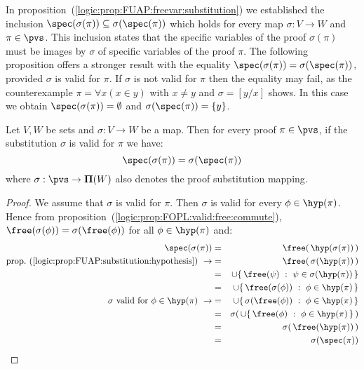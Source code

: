 In proposition~(\ref{logic:prop:FUAP:freevar:substitution}) we
established the inclusion
$\spec(\sigma(\pi))\subseteq\sigma(\spec(\pi))$ which holds for
every map $\sigma:V\to W$ and $\pi\in\pvs$. This inclusion states
that the specific variables of the proof $\sigma(\pi)$ must be
images by $\sigma$ of specific variables of the proof $\pi$. The
following proposition offers a stronger result with the equality
$\spec(\sigma(\pi))=\sigma(\spec(\pi))$, provided $\sigma$ is valid
for $\pi$. If $\sigma$ is not valid for $\pi$ then the equality may
fail, as the counterexample $\pi=\forall x(x\in y)$ with $x\neq y$
and $\sigma=[y/x]$ shows. In this case we obtain
$\spec(\sigma(\pi))=\emptyset$ and $\sigma(\spec(\pi))=\{y\}$.
\begin{prop}\label{logic:prop:FUAP:validsubproof:specvar}
Let $V, W$ be sets and $\sigma:V\to W$ be a map. Then for every
proof $\pi\in\pvs$, if  the substitution $\sigma$ is valid for $\pi$
we have:
    \[
    \spec(\sigma(\pi))=\sigma(\spec(\pi))
    \]
where $\sigma:\pvs\to{\bf\Pi}(W)$ also denotes the proof
substitution mapping.
\end{prop}
\begin{proof}
We assume that $\sigma$ is valid for $\pi$. Then $\sigma$ is valid
for every $\phi\in\hyp(\pi)$. Hence from
proposition~(\ref{logic:prop:FOPL:valid:free:commute}),
$\free(\sigma(\phi))=\sigma(\free(\phi))$ for all $\phi\in\hyp(\pi)$
and:
    \begin{eqnarray*}
    \spec(\sigma(\pi))&=&\free(\,\hyp(\sigma(\pi))\,)\\
    \mbox{prop.~(\ref{logic:prop:FUAP:substitution:hypothesis})}\ \rightarrow
    &=&\free(\,\sigma(\hyp(\pi))\,)\\
    &=&\cup\{\,\free(\psi)\ :\ \psi\in\sigma(\hyp(\pi))\,\}\\
    &=&\cup\{\,\free(\sigma(\phi))\ :\ \phi\in\hyp(\pi)\,\}\\
    \mbox{$\sigma$ valid for $\phi\in\hyp(\pi)$}\ \rightarrow
    &=&\cup\{\,\sigma(\free(\phi))\ :\ \phi\in\hyp(\pi)\,\}\\
    &=&\sigma(\,\cup\{\,\free(\phi)\ :\ \phi\in\hyp(\pi)\,\}\,)\\
    &=&\sigma(\,\free(\hyp(\pi))\,)\\
    &=&\sigma(\spec(\pi))
    \end{eqnarray*}
\end{proof}

